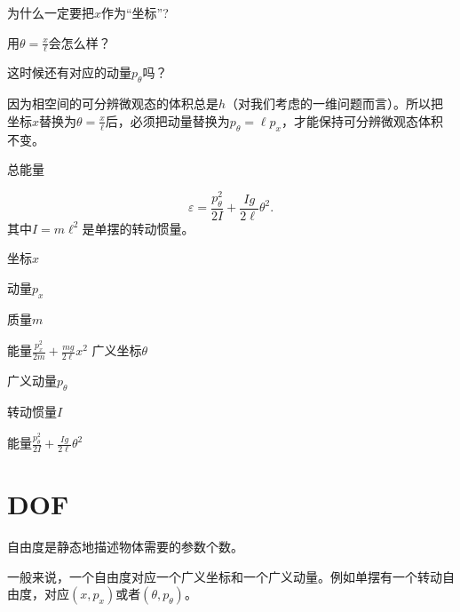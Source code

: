 \documentclass[CJK]{beamer}
\begin{document}
\begin{frame}
\bch
{}
\emini
{}
      {\large
        为什么一定要把$x$作为“坐标”?
        
        用$\theta=\frac{x}{\ell}$会怎么样？
        
        这时候还有对应的动量$p_\theta$吗？
}
     \emini
\ech
\end{frame}


\begin{frame}
\bch
{\large
因为相空间的可分辨微观态的体积总是$h$（对我们考虑的一维问题而言）。所以把坐标$x$替换为$\theta = \frac{x}{\ell}$后，必须把动量替换为$p_\theta = \ell p_x$，才能保持可分辨微观态体积不变。

\skipline

总能量

$$\varepsilon = \frac{p_\theta^2}{2I}+\frac{Ig}{2\ell}  \theta^2. $$
其中$I=m\ell^2$是单摆的转动惯量。

}
\ech
\end{frame}

\begin{frame}
\bch
    {\large


  坐标$x$

  动量$p_x$

  质量$m$

  能量$\frac{p_x^2}{2m} + \frac{mg}{2\ell} x^2$
  \emini
  广义坐标$\theta$ 

  广义动量$p_\theta$ 

  转动惯量$I$

  能量$\frac{p_\theta^2}{2I} + \frac{Ig}{2\ell} \theta^2$
  \emini



}
\ech
\end{frame}

\section{DOF}


\begin{frame}
\bch
    {\large
自由度是静态地描述物体需要的参数个数。
    }


    {\large
一般来说，一个自由度对应一个广义坐标和一个广义动量。例如单摆有一个转动自由度，对应$(x, p_x)$或者$(\theta, p_\theta)$。    
    }
\ech
\end{frame}
\end{document}
